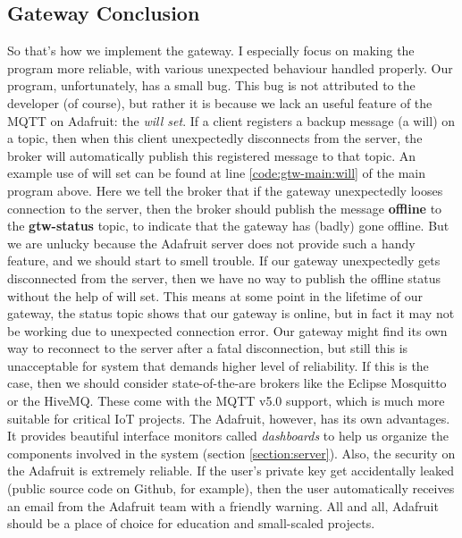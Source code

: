 \subsection{Gateway Conclusion}
So that's how we implement the gateway. I especially focus on making the program more reliable, with various unexpected behaviour handled properly. Our program, unfortunately, has a small bug. This bug is not attributed to the developer (of course), but rather it is because we lack an useful feature of the MQTT on Adafruit: the \textit{will set}. If a client registers a backup message (a will) on a topic, then when this client unexpectedly disconnects from the server, the broker will automatically publish this registered message to that topic. An example use of will set can be found at line \ref{code:gtw-main:will} of the main program above. Here we tell the broker that if the gateway unexpectedly looses connection to the server, then the broker should publish the message \textbf{offline} to the \textbf{gtw-status} topic, to indicate that the gateway has (badly) gone offline. But we are unlucky because the Adafruit server does not provide such a handy feature, and we should start to smell trouble. If our gateway unexpectedly gets disconnected from the server, then we have no way to publish the offline status without the help of will set. This means at some point in the lifetime of our gateway, the status topic shows that our gateway is online, but in fact it may not be working due to unexpected connection error. Our gateway might find its own way to reconnect to the server after a fatal disconnection, but still this is unacceptable for system that demands higher level of reliability. If this is the case, then we should consider state-of-the-are brokers like the Eclipse Mosquitto or the HiveMQ. These come with the MQTT v5.0 support, which is much more suitable for critical IoT projects. The Adafruit, however, has its own advantages. It provides beautiful interface monitors called \textit{dashboards} to help us organize the components involved in the system (section \ref{section:server}). Also, the security on the Adafruit is extremely reliable. If the user's private key get accidentally leaked (public source code on Github, for example), then the user automatically receives an email from the Adafruit team with a friendly warning. All and all, Adafruit should be a place of choice for education and small-scaled projects.
\clearpage